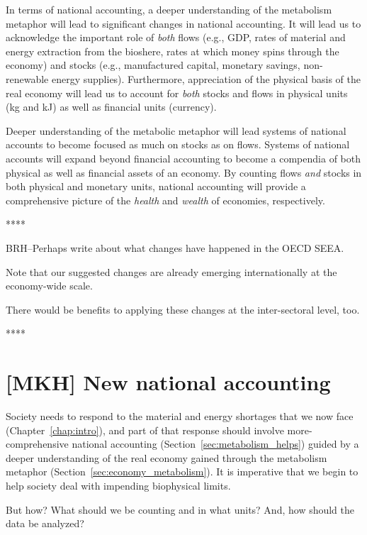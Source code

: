 In terms of national accounting, 
a deeper understanding of the metabolism metaphor 
will lead to significant changes in national accounting.
It will lead us to acknowledge
the important role of \emph{both} flows 
(e.g., GDP, 
rates of material and energy extraction from the bioshere,
rates at which money spins through the economy)
and stocks 
(e.g., manufactured capital, monetary savings, non-renewable energy supplies).
Furthermore, appreciation of the physical basis of the real economy will lead us 
to account for \emph{both} stocks and flows 
in physical units (kg and kJ) as well as financial units (currency).

Deeper understanding of the metabolic metaphor will
lead systems of national accounts to become
focused as much on stocks as on flows.
Systems of national accounts will expand beyond financial accounting
to become a compendia of both physical as well as financial assets
of an economy.
By counting flows \emph{and} stocks 
in both physical and monetary units,
national accounting will provide a comprehensive picture 
of the \emph{health} and \emph{wealth} of economies, respectively.

**** 

BRH--Perhaps write about what changes have happened in the OECD SEEA.

Note that our suggested changes are already 
emerging internationally at the economy-wide scale.

There would be benefits to applying these changes at the inter-sectoral level, too.

****


\section{[MKH] New national accounting}
\label{sec:new_national_accounting}

Society needs to respond 
to the material and energy shortages that
we now face (Chapter~\ref{chap:intro}),
and part of that response
should involve more-comprehensive national accounting 
(Section~\ref{sec:metabolism_helps}) 
guided by a deeper understanding of the real economy 
gained through the metabolism metaphor (Section~\ref{sec:economy_metabolism}).
It is imperative that we begin
to help society deal with impending biophysical limits.

But how? 
What should we be counting and in what units?
And, how should the data be analyzed?

